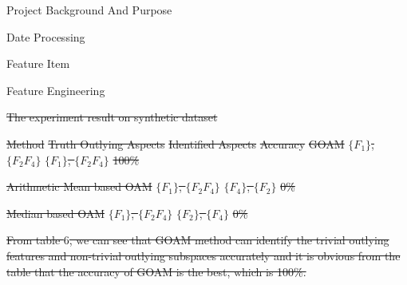 \documentclass[
 size=14pt,
 paper=smartboard,  %
 mode=present, 		%
 display=slides, 	%
 style=tuliplab,  	%
 pauseslide,
 fleqn,leqno]{powerdot}
\providecommand{\DIFdeltex}[1]{{\protect\color{red}\sout{#1}}}                      %
\providecommand{\DIFdelFL}[1]{\DIFdel{#1}} %
\providecommand{\DIFdel}[1]{\texorpdfstring{\DIFdeltex{#1}}{}} %
\begin{document}
\begin{slide}
\begin{slide}{Project Background And Purpose}
\begin{slide}{Date Processing}
\begin{slide}{Feature Item}
\begin{slide}{Feature Engineering}
\begin{itemize}

{%
\DIFdelFL{The experiment result on synthetic dataset}}

  \DIFdelFL{Method     }%
\DIFdelFL{Truth Outlying Aspects    }%
\DIFdelFL{Identified Aspects }%
\DIFdelFL{Accuracy      }%
\DIFdelFL{GOAM       }%
\DIFdelFL{$\{F_1\}$, $\{F_2F_4\}$   }%
\DIFdelFL{$\{F_1\}$, $\{F_2F_4\}$    }%
\DIFdelFL{100\%    }%

\DIFdelFL{Arithmetic Mean based OAM }%
\DIFdelFL{$\{F_1\}$, $\{F_2F_4\}$   }%
\DIFdelFL{$\{F_4\}$, $\{F_2\}$    }%
\DIFdelFL{0\% }%

\DIFdelFL{Median based OAM }%
\DIFdelFL{$\{F_1\}$, $\{F_2F_4\}$   }%
\DIFdelFL{$\{F_2\}$, $\{F_4\}$    }%
\DIFdelFL{0\% }%

\DIFdel{From table $6$,
we can see that GOAM method can identify the trivial outlying features
and non-trivial outlying subspaces accurately and
it is obvious from the
 table that the accuracy of GOAM is the best, which is 100\%.
}%


\end{itemize}
\end{slide}
\end{slide}
\end{slide}
\end{slide}
\end{slide}
\end{document}
